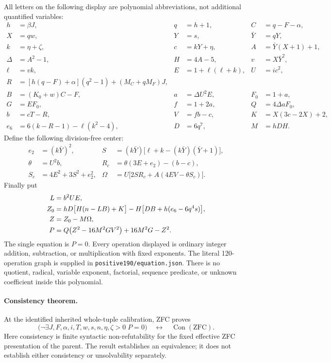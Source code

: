 All letters on the following display are polynomial abbreviations, not
additional quantified variables:
\begin{align*}
 h&=\beta J,&q&=h+1,&C&=q-F-\alpha,\\
 X&=qw,&Y&=s,&\bar Y&=qY,\\
 k&=\eta+\zeta,&c&=kY+\eta,&A&=\bar Y(X+1)+1,\\
 \Delta&=A^2-1,&H&=4A-5,&v&=X\bar Y^2,\\
 \ell&=vk,&E&=1+\ell(\ell+k),&U&=ic^2,\\
 R&=[h(q-F)+\alpha](q^2-1)+(M_C+qM_F)J,&&&\\
 B&=(K_0+w)C-F,&a&=\Delta U^2E,&F_0&=1+a,\\
 G&=EF_0,&f&=1+2a,&Q&=4\Delta aF_0,\\
 b&=cT-R,&V&=fb-c,&K&=X(3c-2X)+2,\\
 e_6&=6(k-R-1)-\ell(k^2-4),&D&=6q^7,&M&=hDH.
\end{align*}
Define the following division-free center:
\begin{align*}
 e_2&=(k\bar Y)^2,&
 S&=(k\bar Y)\bigl[\ell+k-(k\bar Y)(\bar Y+1)\bigr],\\
 \theta&=U^2b,&
 R_c&=\theta(3E+e_2)-(b-c),\\
 S_c&=4E^2+3S^2+e_2^2,&
 \Omega&=U\bigl[2SR_c+A(4EV-\theta S_c)\bigr].
\end{align*}
Finally put
\begin{align}
 L&=b^2UE,\label{eq:weighted-L}\\
 Z_0&=hD\bigl[H(n-LB)+K\bigr]
        -H\bigl[DB+h(e_6-6q^4s)\bigr],\notag\\
 Z&=Z_0-M\Omega,\notag\\
 P&=Q\bigl(Z^2-16M^2GV^2\bigr)+16M^2G-Z^2.\label{eq:positive190}
\end{align}
The single equation is $P=0$. Every operation displayed is ordinary integer
addition, subtraction, or multiplication with fixed exponents. The literal
120-operation graph is supplied in \texttt{positive190/equation.json}.
There is no quotient, radical, variable exponent, factorial, sequence
predicate, or unknown coefficient inside this polynomial.

\paragraph{Consistency theorem.}
At the identified inherited whole-tuple calibration, ZFC proves
\[
 \bigl(\neg\exists J,F,\alpha,i,T,w,s,n,\eta,\zeta>0\;P=0\bigr)
 \quad\longleftrightarrow\quad\operatorname{Con}(\mathrm{ZFC}).
\]
Here consistency is finite syntactic non-refutability for the fixed effective
ZFC presentation of the parent. The result establishes an equivalence; it
does not establish either consistency or unsolvability separately.

